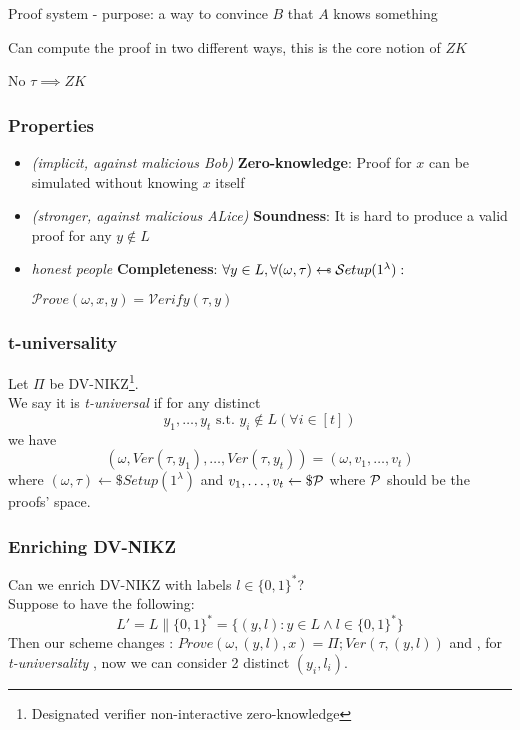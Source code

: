 Proof system - purpose: a way to convince $B$ that $A$ knows something

Can compute the proof in two different ways, this is the core notion of $ZK$

No $\tau \implies ZK$

\subsubsection{Properties}

\begin{itemize}
    \item \textit{(implicit, against malicious Bob)} \textbf{Zero-knowledge}: Proof for $x$ can be simulated without knowing $x$ itself
    \item \textit{(stronger, against malicious ALice)} \textbf{Soundness}: It is hard to produce a valid proof for any $y \notin L$
    \item \textit{honest people} \textbf{Completeness}: $\forall y \in L, \forall (\omega, \tau) \pickUAR \mathcal{S}etup(1^\lambda):$
    
    $\mathcal{P}rove(\omega, x, y) = \mathcal{V}erify(\tau, y)$
\end{itemize}


\subsubsection{t-universality}
\begin{definition}
    Let $\Pi$ be DV-NIKZ\footnote{Designated verifier non-interactive
    zero-knowledge}.\\
We say it is \textit{t-universal} if for any distinct 
\[
    y_{1}, \ldots, y_{t} \text{ s.t. } y_{i}\not\in L ( \forall i \in [t])
\]
we have 
\[
    ( \omega, Ver(\tau, y_{1}), \ldots, Ver(\tau, y_{t}))=(\omega, v_{1},
    \ldots, v_{t})
\]
where $(\omega, \tau) \leftarrow\$ Setup(1^{\lambda})$ and $v_{1}, \ldots, v_{t}
\leftarrow\$ \P$ where $\P$ should be the proofs' space.
\end{definition}

\subsubsection{Enriching DV-NIKZ}
Can we enrich DV-NIKZ with labels $l \in \{0,1\}^{*}$?\\

Suppose to have the following:
\[
    L'=L \| \{0,1\}^{*}=\{(y,l): y \in L \wedge l \in \{0,1\}^{*}\}
\]
Then our scheme changes :
$Prove(\omega, (y,l), x)=\Pi; Ver(\tau, (y, l)) $
and , for \textit{t-universality} , now we can consider 2 distinct $(y_{i},
l_{i})$.
